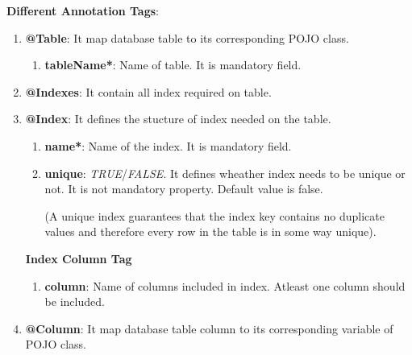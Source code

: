 \textbf{Different Annotation Tags}:

\begin{enumerate}

	\item \small \textbf{@Table}: It map database table to its corresponding POJO class.
		
		\begin{enumerate}

			\item \small \textbf{tableName*}: Name of table. It is mandatory field.

		\end{enumerate}
	

	\item \small \textbf{@Indexes}: It contain all index required on table.


	\item \small \textbf{@Index}: It defines the stucture of  index needed on the table.

		\begin{enumerate}

			\item \small \textbf{name*}: Name of the index. It is mandatory field.
			\item \small \textbf{unique}: \textit{TRUE}/\textit{FALSE}. It defines wheather index needs to be unique or not. It is not mandatory property. Default value is false.
				
				\par
				(A unique index guarantees that the index key contains no duplicate values and therefore every row in the table is in some way unique). 


		\end{enumerate}

		
		\par
		\textbf{Index Column Tag}

		\begin{enumerate}

			\item \small \textbf{column}: Name of columns included in index. Atleast one column should be included.

		\end{enumerate}

	\item \small \textbf{@Column}: It map database table column to its corresponding variable of POJO class.

		\begin{enumerate}


\end{enumerate}
\end{enumerate}

